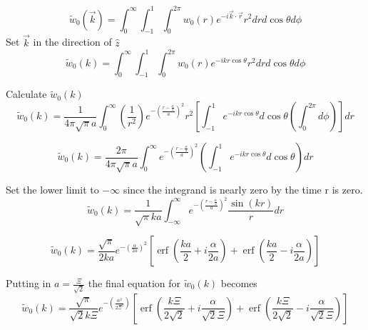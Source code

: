 \documentclass[double,12pt]{beavtex}
\begin{document}
\begin{equation}{\widetilde{w}_0(\vec{k})=\int_{0}^{\infty}\int_{-1}^{1}\int_{0}^{2\pi}w_0(r)e^{-i\vec{k}\cdot{\vec{r}}}r^2d{r}d{\cos\theta}d{\phi}}\end{equation}
Set $\vec{k}$ in the direction of $\hat{z}$ 
\begin{equation}{\widetilde{w}_0(k)=\int_{0}^{\infty}\int_{-1}^{1}\int_{0}^{2\pi}w_0(r)e^{-ikr\cos\theta}r^2d{r}d{\cos\theta}d{\phi}}\end{equation}

Calculate $\widetilde{w}_0(k)$ 
\begin{equation}{\widetilde{w}_0(k)=\frac{1}{4{\pi}\sqrt{\pi}a}\int_{0}^{\infty}\left(\frac{1}{r^2}\right)e^{-\left(\frac{r-\frac{\alpha}{2}}{a}\right)^2}r^2\left[\int_{-1}^{1}e^{-ikr\cos\theta}d{\cos\theta}\left(\int_{0}^{2\pi}d{\phi}\right)\right]d{r}}\end{equation}

\begin{equation}{\widetilde{w}_0(k)=\frac{2\pi}{4{\pi}\sqrt{\pi}a}\int_{0}^{\infty}e^{-\left(\frac{r-\frac{\alpha}{2}}{a}\right)^2}\left(\int_{-1}^{1}e^{-ikr\cos\theta}d{\cos\theta}\right)d{r}}\end{equation}

Set the lower limit to $-\infty$  since the integrand is nearly zero by the time r is zero. 
\begin{equation}{\widetilde{w}_0(k)=\frac{1}{\sqrt{\pi}ka}\int_{-\infty}^{\infty}e^{-\left(\frac{r-\frac{\alpha}{2}}{a}\right)^2}\frac{\sin(kr)}{r}d{r}}\end{equation}

\begin{equation}{\widetilde{w}_0(k)=\frac{\sqrt{\pi}}{2ka}e^{-\left(\frac{\alpha}{2a}\right)^2}\left[\operatorname{erf}\left(\frac{ka}{2}+i\frac{\alpha}{2a}\right)+\operatorname{erf}\left(\frac{ka}{2}-i\frac{\alpha}{2a}\right)\right]}\end{equation}
 
Putting in $a=\frac{\Xi}{\sqrt{2}}$ the final equation for $\widetilde{w}_0(k)$ becomes
\begin{equation}{\widetilde{w}_0(k)=\frac{\sqrt{\pi}}{\sqrt{2}k\Xi}e^{-\left(\frac{\alpha^2}{2\Xi^2}\right)}\left[\operatorname{erf}\left(\frac{k\Xi}{2\sqrt{2}}+i\frac{\alpha}{\sqrt{2}\Xi}\right)+\operatorname{erf}\left(\frac{k\Xi}{2\sqrt{2}}-i\frac{\alpha}{\sqrt{2}\Xi}\right)\right]}\end{equation}
\end{document}

